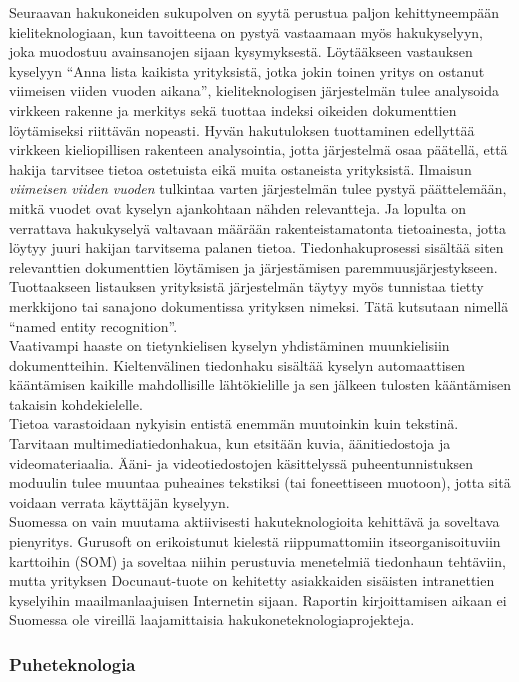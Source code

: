 \begin{multicols}{2}
Seuraavan hakukoneiden sukupolven on syytä perustua paljon
kehittyneempään kieliteknologiaan, kun tavoitteena on
pystyä vastaamaan myös hakukyselyyn, joka muodostuu
avainsanojen sijaan kysymyksestä. Löytääkseen vastauksen kyselyyn “Anna lista 
kaikista yrityksistä, jotka jokin toinen yritys on ostanut viimeisen viiden vuoden aikana”,
kieliteknologisen järjestelmän tulee analysoida virkkeen rakenne ja merkitys 
sekä tuottaa indeksi oikeiden dokumenttien löytämiseksi riittävän nopeasti. 
Hyvän hakutuloksen tuottaminen edellyttää virkkeen kieliopillisen rakenteen
analysointia, jotta järjestelmä osaa päätellä, että hakija tarvitsee
tietoa ostetuista eikä muita ostaneista yrityksistä. Ilmaisun
\textit{viimeisen viiden vuoden} tulkintaa varten järjestelmän tulee
pystyä päättelemään, mitkä vuodet ovat kyselyn ajankohtaan nähden
relevantteja. Ja lopulta on verrattava hakukyselyä valtavaan määrään
rakenteistamatonta tietoainesta, jotta löytyy juuri hakijan tarvitsema palanen 
tietoa. Tiedonhakuprosessi sisältää siten relevanttien dokumenttien löytämisen ja 
järjestämisen paremmuusjärjestykseen. Tuottaakseen listauksen yrityksistä 
järjestelmän täytyy myös tunnistaa tietty merkkijono tai sana\-jono dokumentissa yrityksen
nimeksi. Tätä kutsutaan nimellä “named entity
recognition”.\\
Vaativampi haaste on tietynkielisen kyselyn yhdistäminen muunkielisiin
dokumentteihin. Kieltenvälinen tiedonhaku sisältää kyselyn
automaattisen kääntämisen kaikille mahdollisille lähtökielille ja sen
jälkeen tulosten kääntämisen takaisin kohdekielelle.\\
Tietoa varastoidaan nykyisin entistä enemmän muutoinkin kuin
tekstinä. Tarvitaan multimediatiedonhakua, kun etsitään kuvia, 
äänitiedostoja ja videomateriaalia. Ääni- ja videotiedostojen käsittelyssä 
puheentunnistuksen moduulin tulee muuntaa puheaines tekstiksi 
(tai foneettiseen muotoon), jotta sitä voidaan verrata käyttäjän kyselyyn.\\
Suomessa on vain muutama aktiivisesti hakuteknologioita kehittävä ja soveltava 
pienyritys. Gurusoft on erikoistunut kielestä riippumattomiin itseorganisoituviin 
karttoihin (SOM) ja soveltaa niihin perustuvia menetelmiä tiedonhaun tehtäviin, 
mutta yrityksen Docunaut-tuote on kehitetty asiakkaiden sisäisten intranettien kyselyihin
maailmanlaajuisen Internetin sijaan. Raportin kirjoittamisen aikaan ei
Suomessa ole vireillä laajamittaisia hakukoneteknologiaprojekteja.



\subsubsection{Puheteknologia}


\end{multicols}
